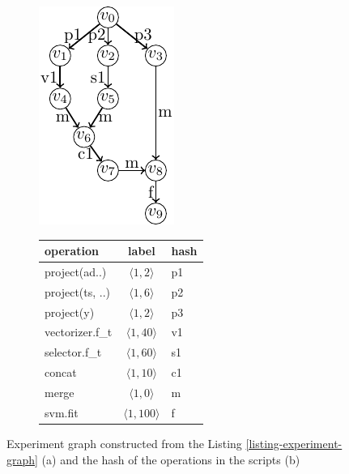 \begin{figure}
\begin{subfigure}[b]{0.4\linewidth}
\centering
\includegraphics[width=0.8\linewidth]{../images/tikz-standalone/example-graph}
\caption{}
\end{subfigure}%
\begin{subfigure}[b]{0.6\linewidth}
\begin{tabular}{lcl}
\hline
operation & label &  hash \\
\hline
project(ad..) & $\langle 1, 2\rangle$ &p1 \\
project(ts, ..) & $\langle 1, 6\rangle$ & p2\\
project(y) & $\langle 1, 2\rangle$ & p3\\
vectorizer.f\_t & $\langle 1, 40\rangle$ & v1 \\
selector.f\_t & $\langle 1, 60\rangle$ & s1 \\
concat & $\langle 1, 10\rangle$ & c1 \\
merge & $\langle 1, 0 \rangle$ & m\\
svm.fit & $\langle 1, 100\rangle$ & f\\
\hline
\end{tabular}
\caption{}
\end{subfigure}
\caption{Experiment graph constructed from the Listing \ref{listing-experiment-graph} (a) and the hash of the operations in the scripts (b)}
\label{fig-experiment-graph}
\end{figure}
